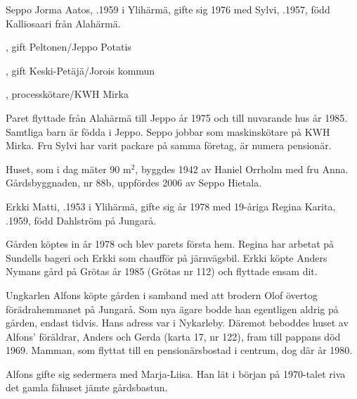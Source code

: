 


Seppo Jorma Aatos, .1959 i Ylihärmä, gifte sig 1976 med Sylvi, .1957,	född Kalliosaari från Alahärmä.
\begin{jhchildren}
  \item {}, gift Peltonen/Jeppo Potatis
  \item {}, gift Keski-Petäjä/Jorois kommun
  \item {}, processkötare/KWH Mirka
\end{jhchildren}

Paret flyttade från Alahärmä till Jeppo år 1975 och till nuvarande hus år 1985. Samtliga barn är födda i Jeppo. Seppo jobbar som maskinskötare på KWH Mirka. Fru Sylvi har varit packare på samma företag, är numera pensionär.

Huset, som i dag mäter 90 m$^2$, byggdes 1942 av Haniel Orrholm med fru Anna. Gårdsbyggnaden, nr 88b, uppfördes 2006 av Seppo Hietala.


Erkki Matti, .1953 i Ylihärmä, gifte sig år 1978 med 19-åriga Regina Karita, .1959, född Dahlström på Jungarå.
\begin{jhchildren}
  \item {}
  \item {}
\end{jhchildren}
Gården köptes in år 1978 och blev parets första hem. Regina har arbetat på Sundells bageri och Erkki som chaufför på järnvägsbil. Erkki köpte Anders Nymans gård på Grötas år 1985 (Grötas nr 112) och flyttade ensam dit.


Ungkarlen Alfons köpte gården i samband med att brodern Olof övertog förädrahemmanet på Jungarå. Som nya ägare bodde han egentligen aldrig på gården, endast tidvis. Hans adress var i Nykarleby. Däremot beboddes huset av Alfons' föräldrar, Anders och Gerda (karta 17, nr 122), fram till pappans död 1969. Mamman, som flyttat till en pensionärsbostad i centrum, dog där år 1980.

Alfons gifte sig sedermera med Marja-Liisa. Han lät i början på 1970-talet riva det gamla fähuset jämte gårdsbastun.


